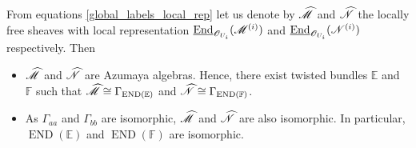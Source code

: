 From equations \eqref{global_labels_local_rep} let us denote by $\widehat{\mathscr{M}}$ and $\widehat{\mathscr{N}}$ the locally free sheaves with local representation $\underline{\operatorname{End}}_{\mathscr{O}_{U_i}}(\mathscr{M}^{(i)})$ and $\underline{\operatorname{End}}_{\mathscr{O}_{U_i}}(\mathscr{N}^{(i)})$ respectively. Then
\begin{itemize}
\item $\widehat{\mathscr{M}}$ and $\widehat{\mathscr{N}}$ are Azumaya algebras. Hence, there exist twisted bundles $\mathbb{E}$ and $\mathbb{F}$ such that $\widehat{\mathscr{M}}\cong \Gamma_{\operatorname{END}(\mathbb{E})}$ and $\widehat{\mathscr{N}}\cong \Gamma_{\operatorname{END}(\mathbb{F})}$.
\item As $\Gamma_{aa}$ and $\Gamma_{bb}$ are isomorphic, $\widehat{\mathscr{M}}$ and $\widehat{\mathscr{N}}$ are also isomorphic. In particular, $\operatorname{END}(\mathbb{E})$ and $\operatorname{END}(\mathbb{F})$ are isomorphic.
\end{itemize}

